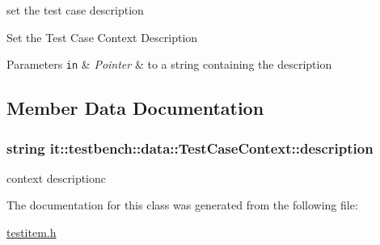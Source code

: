 set the test case description 

Set the Test Case Context Description


\begin{DoxyParams}[1]{Parameters}
\mbox{\tt in}  & {\em Pointer} & to a string containing the description \\
\hline
\end{DoxyParams}


\subsection{Member Data Documentation}
\hypertarget{classit_1_1testbench_1_1data_1_1TestCaseContext_a48eae7f179630179c3bb3cda1cbde0b0}{
\subsubsection[{description}]{\setlength{\rightskip}{0pt plus 5cm}string it\-::testbench\-::data\-::\-Test\-Case\-Context\-::description\hspace{0.3cm}{\ttfamily [protected]}}}\label{d9/d60/classit_1_1testbench_1_1data_1_1TestCaseContext_a48eae7f179630179c3bb3cda1cbde0b0}
context descriptionc 

The documentation for this class was generated from the following file\-:\begin{DoxyCompactItemize}
\item 
\hyperlink{testitem_8h}{testitem.\-h}\end{DoxyCompactItemize}
